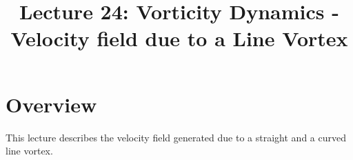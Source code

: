 \documentclass[11pt,a4paper]{article}
\title{Lecture 24: Vorticity Dynamics - Velocity field due to a Line Vortex}
\date{\displaydate{date}}
\author{}
\begin{document}
\maketitle
\section{Overview}
This lecture describes the velocity field generated due to a straight and a curved line vortex.
\end{document}
